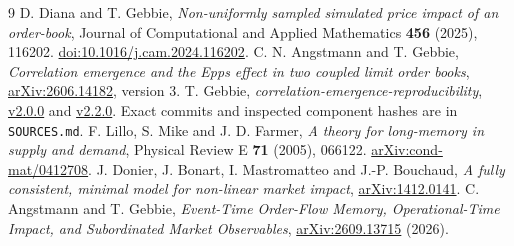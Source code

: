 \documentclass[11pt,a4paper]{article}
\begin{document}
\begin{thebibliography}{9}\small
{} D. Diana and T. Gebbie, \emph{Non-uniformly sampled simulated
price impact of an order-book}, Journal of Computational and Applied
Mathematics \textbf{456} (2025), 116202.
\href{https://doi.org/10.1016/j.cam.2024.116202}{doi:10.1016/j.cam.2024.116202}.
 C. N. Angstmann and T. Gebbie, \emph{Correlation emergence and
the Epps effect in two coupled limit order books},
\href{https://arxiv.org/abs/2606.14182}{arXiv:2606.14182}, version 3.
 T. Gebbie, \emph{correlation-emergence-reproducibility},
\href{https://github.com/timgebbie/correlation-emergence-reproducibility/releases/tag/v2.0.0}{v2.0.0}
and \href{https://github.com/timgebbie/correlation-emergence-reproducibility/releases/tag/v2.2.0}{v2.2.0}.
Exact commits and inspected component hashes are in \texttt{SOURCES.md}.
 F. Lillo, S. Mike and J. D. Farmer, \emph{A theory for
long-memory in supply and demand}, Physical Review E \textbf{71} (2005),
066122. \href{https://arxiv.org/abs/cond-mat/0412708}{arXiv:cond-mat/0412708}.
 J. Donier, J. Bonart, I. Mastromatteo and J.-P. Bouchaud,
\emph{A fully consistent, minimal model for non-linear market impact},
\href{https://arxiv.org/abs/1412.0141}{arXiv:1412.0141}.
 C. Angstmann and T. Gebbie, \emph{Event-Time Order-Flow
Memory, Operational-Time Impact, and Subordinated Market Observables},
\href{https://arxiv.org/abs/2609.13715}{arXiv:2609.13715} (2026).
\end{thebibliography}
\end{document}
